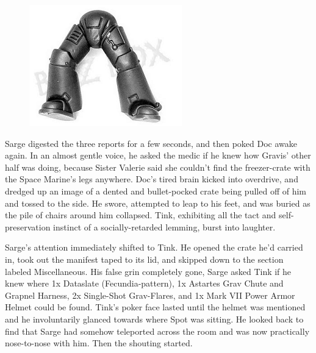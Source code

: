 \begin{figure}
	\begin{center}
		\includegraphics[width=\figwidth]{pics/15/4.png}
	\end{center}
\end{figure}
Sarge digested the three reports for a few seconds, and then poked Doc awake again. 
In an almost gentle voice, he asked the medic if he knew how Gravis' other half was doing, because Sister Valerie said she couldn't find the freezer-crate with the Space Marine's legs anywhere. 
Doc's tired brain kicked into overdrive, and dredged up an image of a dented and bullet-pocked crate being pulled off of him and tossed to the side. 
He swore, attempted to leap to his feet, and was buried as the pile of chairs around him collapsed. 
Tink, exhibiting all the tact and self-preservation instinct of a socially-retarded lemming, burst into laughter.

Sarge's attention immediately shifted to Tink. 
He opened the crate he'd carried in, took out the manifest taped to its lid, and skipped down to the section labeled Miscellaneous. 
His false grin completely gone, Sarge asked Tink if he knew where 1x Dataslate (Fecundia-pattern), 1x Astartes Grav Chute and Grapnel Harness, 2x Single-Shot Grav-Flares, and 1x Mark VII Power Armor Helmet could be found. 
Tink's poker face lasted until the helmet was mentioned and he involuntarily glanced towards where Spot was sitting. 
He looked back to find that Sarge had somehow teleported across the room and was now practically nose-to-nose with him. 
Then the shouting started.

